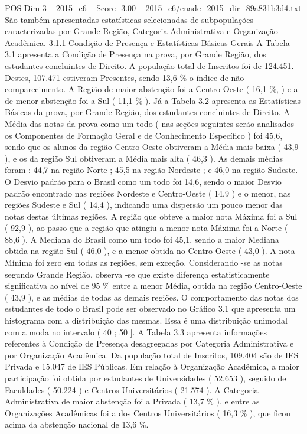 \begin{textsample}{POS Dim 3 – 2015\_c6 – Score -3.00 – 2015\_c6/enade\_2015\_dir\_89a831b3d4.txt}
São também apresentadas estatísticas selecionadas de subpopulações caracterizadas por Grande Região, Categoria Administrativa e Organização Acadêmica. 3.1.1 Condição de Presença e Estatísticas Básicas Gerais A Tabela 3.1 apresenta a Condição de Presença na prova, por Grande Região, dos estudantes concluintes de Direito.
A população total de Inscritos foi de 124.451.
Destes, 107.471 estiveram Presentes, sendo 13,6 \% o índice de não comparecimento.
A Região de maior abstenção foi a Centro-Oeste ( 16,1 \%, ) e a de menor abstenção foi a Sul ( 11,1 \% ).
Já a Tabela 3.2 apresenta as Estatísticas Básicas da prova, por Grande Região, dos estudantes concluintes de Direito.
A Média das notas da prova como um todo ( nas seções seguintes serão analisados os Componentes de Formação Geral e de Conhecimento Específico ) foi 45,6, sendo que os alunos da região Centro-Oeste obtiveram a Média mais baixa ( 43,9 ), e os da região Sul obtiveram a Média mais alta ( 46,3 ).
As demais médias foram : 44,7 na região Norte ; 45,5 na região Nordeste ; e 46,0 na região Sudeste.
O Desvio padrão para o Brasil como um todo foi 14,6, sendo o maior Desvio padrão encontrado nas regiões Nordeste e Centro-Oeste ( 14,9 ) e o menor, nas regiões Sudeste e Sul ( 14,4 ), indicando uma dispersão um pouco menor das notas destas últimas regiões.
A região que obteve a maior nota Máxima foi a Sul ( 92,9 ), ao passo que a região que atingiu a menor nota Máxima foi a Norte ( 88,6 ).
A Mediana do Brasil como um todo foi 45,1, sendo a maior Mediana obtida na região Sul ( 46,0 ), e a menor obtida no Centro-Oeste ( 43,0 ).
A nota Mínima foi zero em todas as regiões, sem exceção.
Considerando -se as notas segundo Grande Região, observa -se que existe diferença estatisticamente significativa ao nível de 95 \% entre a menor Média, obtida na região Centro-Oeste ( 43,9 ), e as médias de todas as demais regiões.
O comportamento das notas dos estudantes de todo o Brasil pode ser observado no Gráfico 3.1 que apresenta um histograma com a distribuição das mesmas.
Essa é uma distribuição unimodal com a moda no intervalo ( 40 ; 50 ].
A Tabela 3.3 apresenta informações referentes à Condição de Presença desagregadas por Categoria Administrativa e por Organização Acadêmica.
Da população total de Inscritos, 109.404 são de IES Privada e 15.047 de IES Públicas.
Em relação à Organização Acadêmica, a maior participação foi obtida por estudantes de Universidades ( 52.653 ), seguido de Faculdades ( 50.224 ) e Centros Universitários ( 21.574 ).
A Categoria Administrativa de maior abstenção foi a Privada ( 13,7 \% ), e entre as Organizações Acadêmicas foi a dos Centros Universitários ( 16,3 \% ), que ficou acima da abstenção nacional de 13,6 \%.

\end{textsample}
